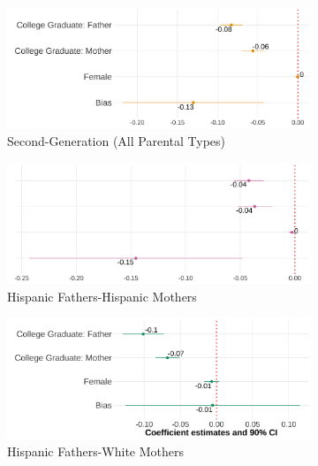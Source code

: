 \documentclass[12pt, fullpage]{article}
\begin{document}
\begin{center}
\begin{figure}[H]
\centering
\caption{Relationship Between Self-Reported Hispanic Identity and Bias: By Parental Types.}
\label{plot01-regression-byparent}
\begin{subfigure}{.48\textwidth}
\caption{Second-Generation (All Parental Types)}
\centering
\includegraphics[width=.9\linewidth]{figure/by-parents-regs-all.png}
\end{subfigure}
\centering
\begin{subfigure}{.48\textwidth}
\caption{Hispanic Fathers-Hispanic Mothers}
\centering
\includegraphics[width=.9\linewidth]{figure/by-parents-regs-hh.png}
\end{subfigure}
\begin{subfigure}{.48\textwidth}
\caption{Hispanic Fathers-White Mothers}
\centering
\includegraphics[width=.9\linewidth]{figure/by-parents-regs-hw.png}
\end{subfigure}
\begin{subfigure}{.48\textwidth}

\end{subfigure}
\end{figure}
\end{center}
\end{document}
